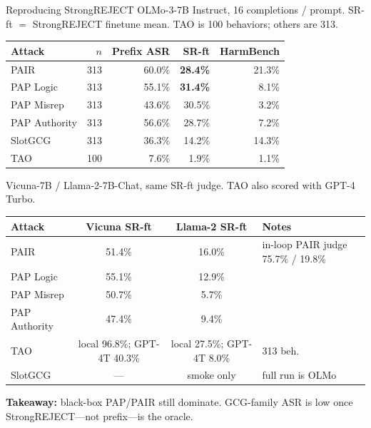 \documentclass[aspectratio=169,10pt]{beamer}
\begin{document}
\begin{frame}{Reproducing StrongREJECT}
{\footnotesize OLMo-3-7B Instruct, 16 completions / prompt. SR-ft $=$ StrongREJECT finetune mean. TAO is 100 behaviors; others are 313.}
\vspace{0.15em}
\scriptsize
\centering
\begin{tabular}{l r r r r}
\toprule
Attack & $n$ & Prefix ASR & SR-ft & HarmBench \\
\midrule
PAIR            & 313 & 60.0\% & \textbf{28.4\%} & 21.3\% \\
PAP Logic       & 313 & 55.1\% & \textbf{31.4\%} & 8.1\% \\
PAP Misrep      & 313 & 43.6\% & 30.5\% & 3.2\% \\
PAP Authority   & 313 & 56.6\% & 28.7\% & 7.2\% \\
SlotGCG         & 313 & 36.3\% & 14.2\% & 14.3\% \\
TAO             & 100 & 7.6\%  & 1.9\%  & 1.1\% \\
\bottomrule
\end{tabular}

\vspace{0.55em}
{\footnotesize Vicuna-7B / Llama-2-7B-Chat, same SR-ft judge. TAO also scored with GPT-4 Turbo.}
\vspace{0.1em}

\begin{tabular}{l c c l}
\toprule
Attack & Vicuna SR-ft & Llama-2 SR-ft & Notes \\
\midrule
PAIR          & 51.4\% & 16.0\% & in-loop PAIR judge 75.7\% / 19.8\% \\
PAP Logic     & 55.1\% & 12.9\% & \\
PAP Misrep    & 50.7\% & 5.7\%  & \\
PAP Authority & 47.4\% & 9.4\%  & \\
TAO           & local 96.8\%; GPT-4T 40.3\% & local 27.5\%; GPT-4T 8.0\% & 313 beh. \\
SlotGCG       & --- & smoke only & full run is OLMo \\
\bottomrule
\end{tabular}

\vspace{0.45em}
\raggedright
{\footnotesize\textbf{Takeaway:} black-box PAP/PAIR still dominate. GCG-family ASR is low once StrongREJECT---not prefix---is the oracle.}
\end{frame}
\end{document}
